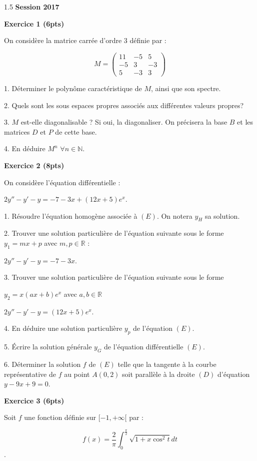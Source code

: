 \documentclass[12pt]{article}
\begin{document}
\begin{spacing}{1.5}
\medskip
\textbf{Session 2017}

\textbf{Exercice 1 (6pts)}


On considère la matrice carrée d'ordre 3 définie par  : 

\[M=\begin{pmatrix}
11 & -5 & 5 \\ 
-5 & 3 & -3 \\ 
5 & -3 & 3
\end{pmatrix}\]

1. Déterminer le polynôme caractéristique de $M$, ainsi que son spectre.

2. Quels sont les sous espaces propres associés aux différentes valeurs propres?

3. $M$ est-elle diagonalisable ? Si oui, la diagonaliser. On précisera la base $B$ et les matrices $D$ et $P$ de cette base.

4. En déduire $M^{n}$ $\forall n\in \mathbb{N}$.


\medskip
\textbf{Exercice 2 (8pts)}

On considère l'équation différentielle :

\begin{center}
$2y''-y'-y=-7-3x+(12x+5)e^x$.
\end{center}

1. Résoudre l'équation homogène associée à $(E)$. On notera $y_H$ sa solution.

2. Trouver une solution particulière de l'équation suivante sous le forme $y_1=mx+p$ avec $m,p\in \mathbb{R}$ :

$2y''-y'-y=-7-3x$.

3. Trouver une solution particulière de l'équation suivante sous le forme 

$y_2=x(ax+b)e^x$ avec $a,b\in \mathbb{R}$

$2y''-y'-y=(12x+5)e^x$.

4. En déduire une solution particulière $y_p$ de l'équation $(E)$.

5. Écrire la solution générale $y_G$ de l'équation différentielle $(E)$.

6. Déterminer la solution $f$ de $(E)$ telle que la tangente à la courbe représentative de $f$ au point $A(0,2)$ soit parallèle à la droite $(D)$ d'équation $y-9x+9=0$.

\medskip
\textbf{Exercice 3 (6pts)}

Soit $f$ une fonction définie sur $[-1,+\infty[$ par :

\[f(x)=\frac{2}{\pi}\int_{0}^{\frac{\pi}{2}}\sqrt{1+x\cos^2t}dt\].


\end{spacing}
\end{document}
